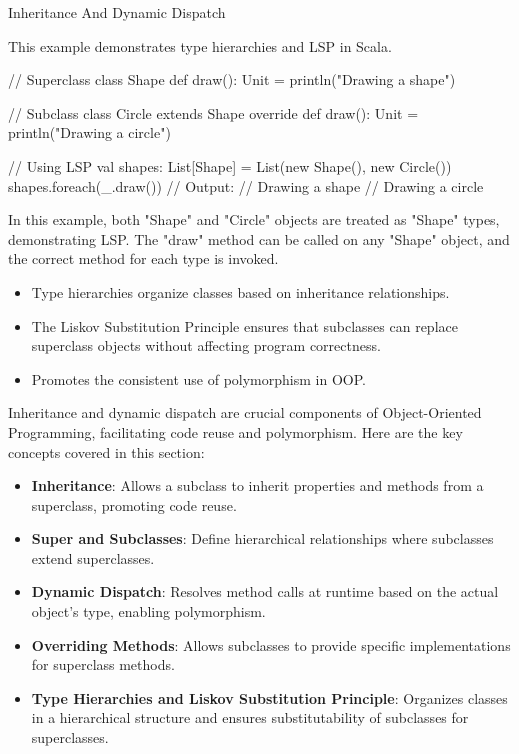 \begin{notes}{Inheritance And Dynamic Dispatch}
    \begin{highlight}
    
        This example demonstrates type hierarchies and LSP in Scala.
    
    \begin{code}[Scala]
    // Superclass
    class Shape {
        def draw(): Unit = println("Drawing a shape")
    }
    
    // Subclass
    class Circle extends Shape {
        override def draw(): Unit = println("Drawing a circle")
    }
    
    // Using LSP
    val shapes: List[Shape] = List(new Shape(), new Circle())
    shapes.foreach(_.draw())
    // Output:
    // Drawing a shape
    // Drawing a circle
    \end{code}
    
        In this example, both "Shape" and "Circle" objects are treated as "Shape" types, demonstrating LSP. The "draw" method can be called on any "Shape" object, and the correct method for each type is invoked.
    
        \begin{itemize}
            \item Type hierarchies organize classes based on inheritance relationships.
            \item The Liskov Substitution Principle ensures that subclasses can replace superclass objects without affecting program correctness.
            \item Promotes the consistent use of polymorphism in OOP.
        \end{itemize}
    
    \end{highlight}
    
    \begin{highlight}
    
        Inheritance and dynamic dispatch are crucial components of Object-Oriented Programming, facilitating code reuse and polymorphism. Here are the key concepts covered in this section:
    
        \begin{itemize}
            \item \textbf{Inheritance}: Allows a subclass to inherit properties and methods from a superclass, promoting code reuse.
            \item \textbf{Super and Subclasses}: Define hierarchical relationships where subclasses extend superclasses.
            \item \textbf{Dynamic Dispatch}: Resolves method calls at runtime based on the actual object's type, enabling polymorphism.
            \item \textbf{Overriding Methods}: Allows subclasses to provide specific implementations for superclass methods.
            \item \textbf{Type Hierarchies and Liskov Substitution Principle}: Organizes classes in a hierarchical structure and ensures substitutability of subclasses for superclasses.
        \end{itemize}
    

\end{highlight}
\end{notes}
